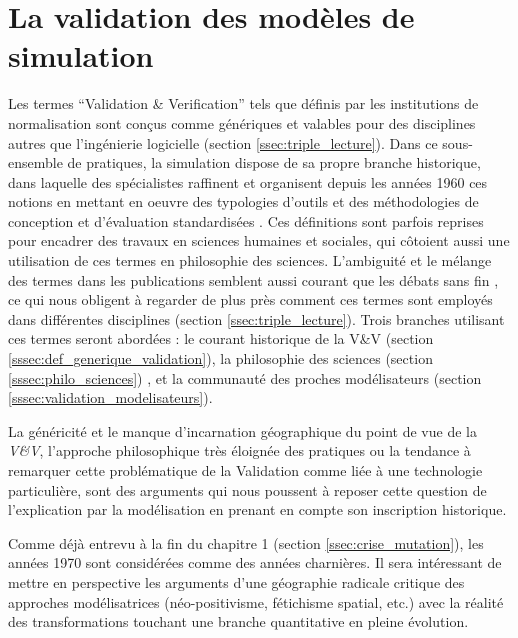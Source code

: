
\section{La validation des modèles de simulation}
\label{sec:constante_problematique}

Les termes \foreignquote{english}{Validation \& Verification} tels que définis par les institutions de normalisation sont conçus comme génériques et valables pour des disciplines autres que l'ingénierie logicielle (section \ref{ssec:triple_lecture}). Dans ce sous-ensemble de pratiques, la simulation dispose de sa propre branche historique, dans laquelle des spécialistes raffinent et organisent depuis les années 1960 ces notions en mettant en oeuvre des typologies d'outils et des méthodologies de conception et d'évaluation standardisées \autocite{Nance2002}. Ces définitions sont parfois reprises pour encadrer des travaux en sciences humaines et sociales, qui côtoient aussi une utilisation de ces termes en philosophie des sciences. L'ambiguité et le mélange des termes dans les publications semblent aussi courant que les débats sans fin \autocites{David2009,Augusiak2014}, ce qui nous obligent à regarder de plus près comment ces termes sont employés dans différentes disciplines (section \ref{ssec:triple_lecture}). Trois branches utilisant ces termes seront abordées : le courant historique de la V\&V (section \ref{sssec:def_generique_validation}), la philosophie des sciences (section \ref{sssec:philo_sciences}) , et la communauté des proches modélisateurs (section \ref{sssec:validation_modelisateurs}).


La généricité et le manque d'incarnation géographique du point de vue de la \textit{V\&V}, l'approche philosophique très éloignée des pratiques ou la tendance à remarquer cette problématique de la Validation comme liée à une technologie particulière, sont des arguments qui nous poussent à reposer cette question de l'explication par la modélisation en prenant en compte son inscription historique.

Comme déjà entrevu à la fin du chapitre 1 (section \ref{ssec:crise_mutation}), les années 1970 sont considérées comme des années charnières. Il sera intéressant de mettre en perspective les arguments d'une géographie radicale critique des approches modélisatrices (néo-positivisme, fétichisme spatial, etc.) avec la réalité des transformations touchant une branche quantitative en pleine évolution.

